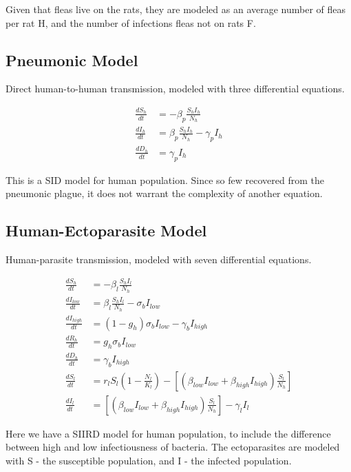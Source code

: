 \documentclass [letterpaper, 12pt] {article}
\begin{document}
Given that fleas live on the rats, they are modeled as an average number of fleas per rat H, and the number of infections fleas not on rats F.

\subsection {Pneumonic Model}
Direct human-to-human transmission, modeled with three differential equations.

\begin{equation}
	\begin{align*}
		\frac{dS_h}{dt} &= - \beta_p \frac{S_h I_h}{N_h} \\
		\frac{dI_h}{dt} &= \beta_p \frac{S_h I_h}{N_h} - \gamma_p I_h \\
		\frac{dD_h}{dt} &= \gamma_p I_h
	\end{align*}
\end{equation}

This is a SID model for human population. Since so few recovered from the pneumonic plague, it does not warrant the complexity of another equation.

\subsection {Human-Ectoparasite Model}
Human-parasite transmission, modeled with seven differential equations.

\begin{equation}
	\begin{align*}
		\frac{dS_h}{dt} &= -\beta_l \frac{S_h I_l}{N_h} \\
		\frac{dI_{low}}{dt} &= \beta_l \frac{S_h I_l}{N_h} - \sigma_b I_{low} \\
		\frac{dI_{high}}{dt} &= (1-g_h) \sigma_b I_{low} - \gamma_b I_{high} \\
		\frac{dR_h}{dt} &= g_h \sigma_b I_{low} \\
		\frac{dD_h}{dt} &= \gamma_b I_{high} \\
		\frac{dS_l}{dt} &= r_l S_l \left( 1 - \frac{N_l}{K_l} \right) - \left[ \left( \beta_{low} I_{low} + \beta_{high} I_{high} \right) \frac{S_l}{N_h} \right] \\
		\frac{dI_l}{dt} &= \left[ \left( \beta_{low} I_{low} + \beta_{high} I_{high} \right) \frac{S_l}{N_h} \right] - \gamma_l I_l
	\end{align*}
\end{equation}

Here we have a SIIRD model for human population, to include the difference between high and low infectiousness of bacteria.
The ectoparasites are modeled with S - the susceptible population, and I - the infected population.
\end{document}
